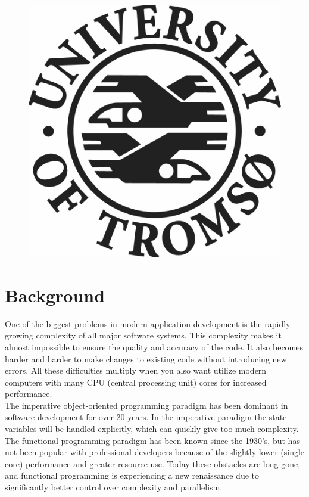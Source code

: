 \documentclass[12pt, a4paper]{article}
\begin{document}
\begin{titlepage}
\begin{figure}[!h]
\begin{minipage}[b]{0.3\textwidth}
  \end{minipage}
  \hfill
  \begin{minipage}[b]{0.3\textwidth}
    \includegraphics[width=\textwidth]{LogoEngelsk}
  \end{minipage}
\end{figure}


\end{titlepage}

\tableofcontents

\newpage

\section{Background}
One of the biggest problems in modern application development is the rapidly growing complexity of all major software systems. This complexity makes it almost impossible to ensure the quality and accuracy of the code. It also becomes harder and harder to make changes to existing code without introducing new errors. All these difficulties multiply when you also want utilize modern computers with many CPU (central processing unit) cores for increased performance.\\

The imperative object-oriented programming paradigm has been dominant in software development for over 20 years. In the imperative paradigm the state variables will be handled explicitly, which can quickly give too much complexity. The functional programming paradigm has been known since the 1930’s, but has not been popular with professional developers because of the slightly lower (single core) performance and greater resource use. Today these obstacles are long gone, and functional programming is experiencing a new renaissance due to significantly better control over complexity and parallelism.\\
\end{document}
